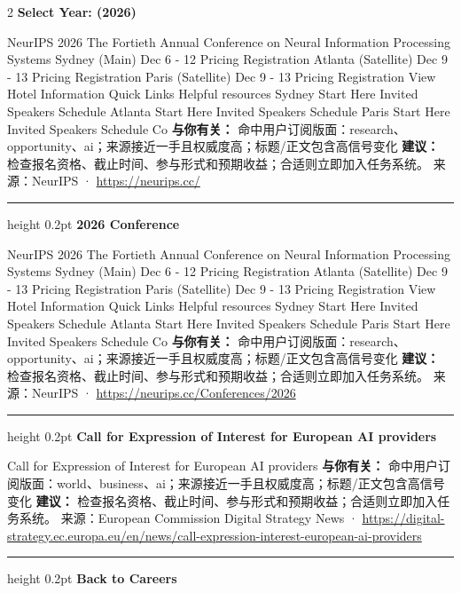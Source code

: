 \documentclass[10.5pt]{ctexart}
\begin{document}
\begin{multicols}{2}
{\large\bfseries Select Year: (2026)}\par
NeurIPS 2026 The Fortieth Annual Conference on Neural Information Processing Systems Sydney (Main) Dec 6 - 12 Pricing Registration Atlanta (Satellite) Dec 9 - 13 Pricing Registration Paris (Satellite) Dec 9 - 13 Pricing Registration View Hotel Information Quick Links Helpful resources Sydney Start Here Invited Speakers Schedule Atlanta Start Here Invited Speakers Schedule Paris Start Here Invited Speakers Schedule Co
\textbf{与你有关：} 命中用户订阅版面：research、opportunity、ai；来源接近一手且权威度高；标题/正文包含高信号变化
\textbf{建议：} 检查报名资格、截止时间、参与形式和预期收益；合适则立即加入任务系统。
{\footnotesize\color{ormuted} 来源：NeurIPS · \url{https://neurips.cc/}}
\vspace{2mm}
\hrule height 0.2pt
\vspace{2mm}
{\large\bfseries 2026 Conference}\par
NeurIPS 2026 The Fortieth Annual Conference on Neural Information Processing Systems Sydney (Main) Dec 6 - 12 Pricing Registration Atlanta (Satellite) Dec 9 - 13 Pricing Registration Paris (Satellite) Dec 9 - 13 Pricing Registration View Hotel Information Quick Links Helpful resources Sydney Start Here Invited Speakers Schedule Atlanta Start Here Invited Speakers Schedule Paris Start Here Invited Speakers Schedule Co
\textbf{与你有关：} 命中用户订阅版面：research、opportunity、ai；来源接近一手且权威度高；标题/正文包含高信号变化
\textbf{建议：} 检查报名资格、截止时间、参与形式和预期收益；合适则立即加入任务系统。
{\footnotesize\color{ormuted} 来源：NeurIPS · \url{https://neurips.cc/Conferences/2026}}
\vspace{2mm}
\hrule height 0.2pt
\vspace{2mm}
{\large\bfseries Call for Expression of Interest for European AI providers}\par
Call for Expression of Interest for European AI providers
\textbf{与你有关：} 命中用户订阅版面：world、business、ai；来源接近一手且权威度高；标题/正文包含高信号变化
\textbf{建议：} 检查报名资格、截止时间、参与形式和预期收益；合适则立即加入任务系统。
{\footnotesize\color{ormuted} 来源：European Commission Digital Strategy News · \url{https://digital-strategy.ec.europa.eu/en/news/call-expression-interest-european-ai-providers}}
\vspace{2mm}
\hrule height 0.2pt
\vspace{2mm}
{\large\bfseries Back to Careers}\par

\end{multicols}
\end{document}

